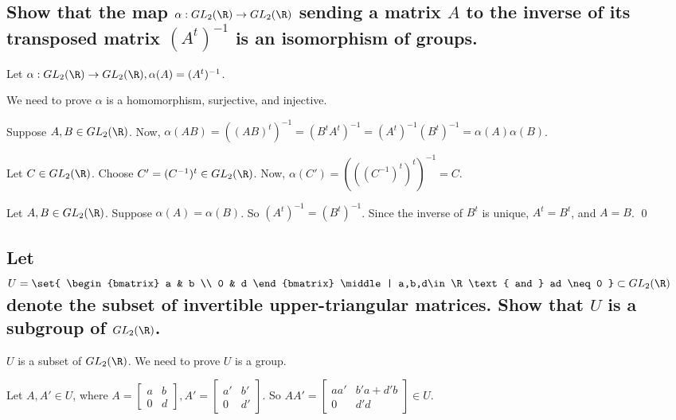 \section[Problem 2]{}
    \subsection[(i)]{Show that the map $\alpha: GL_2(\R) \to GL_2(\R)$ sending a matrix $A$
        to the inverse of its transposed matrix $(A^t)^{-1}$ is an isomorphism of groups.}
        Let $\alpha : GL_2(\R) \to GL_2(\R), \alpha(A) = (A^t)^{-1}$.

        We need to prove $\alpha$ is a homomorphism, surjective, and injective.

        Suppose $A,B \in GL_2(\R)$.
        Now, $\alpha(AB) = ((AB)^t)^{-1} = (B^tA^t)^{-1} = (A^t)^{-1}(B^t)^{-1} = \alpha(A)\alpha(B)$.

        Let $C \in GL_2(\R)$.
        Choose $C' = (C^{-1})^t \in GL_2(\R)$.
        Now, $\alpha(C') = (((C^{-1})^t)^t)^{-1} = C$.

        Let $A,B \in GL_2(\R)$.
        Suppose $\alpha(A) = \alpha(B)$.
        So $(A^t)^{-1} = (B^t)^{-1}$.
        Since the inverse of $B^t$ is unique, $A^t = B^t$, and $A = B$.
        \qed

    \subsection[(ii)]{Let $U = 
        \set{
            \begin{bmatrix}
            a & b \\
            0 & d
            \end{bmatrix} 
            \middle | a,b,d\in \R \text{ and } ad \neq 0
        } \subset GL_2(\R)$
        denote the subset of invertible upper-triangular matrices. 
        Show that $U$ is a subgroup of $GL_2(\R)$.
    }
        $U$ is a subset of $GL_2(\R)$.
        We need to prove $U$ is a group.

        Let $A,A' \in U$,
        where $
        A = 
        \begin{bmatrix}
            a & b \\
            0 & d
        \end{bmatrix},
        A' = 
        \begin{bmatrix}
            a' & b' \\
            0 & d'
        \end{bmatrix}$.
        So $AA' = \begin{bmatrix}
            aa' & b'a + d'b \\
            0 & d'd
        \end{bmatrix} \in U$.

